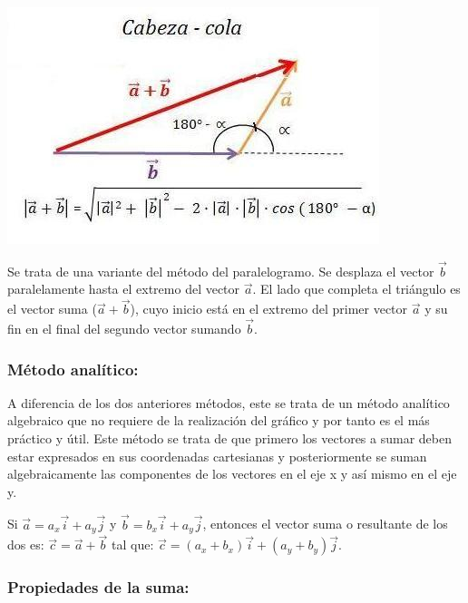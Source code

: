 \begin{center}
 \includegraphics[scale=0.7]{images/suma-vectores-metodo-cabeza-cola.jpg}
\end{center}

Se trata de una variante del método del paralelogramo. Se desplaza el vector $\vec{b}$ paralelamente hasta el extremo 
del vector $\vec{a}$. El lado que completa el triángulo es el vector suma ($\vec{a} + \vec{b}$), cuyo inicio está en el 
extremo del primer vector $\vec{a}$ y su fin en el final del segundo vector sumando $\vec{b}$. 
    
\subsubsection{Método analítico:}     

A diferencia de los dos anteriores métodos, este se trata de un método analítico algebraico que no requiere de la 
realización del gráfico y por tanto es el más práctico y útil. Este método se trata de que primero los vectores a sumar 
deben estar expresados en sus coordenadas cartesianas y posteriormente se suman algebraicamente las componentes de los 
vectores en el eje x y así mismo en el eje y.

\begin{tcolorbox}
 Si $\vec{a} = a_x\vec{i}+a_y\vec{j}$ y $\vec{b} = b_x\vec{i}+a_y\vec{j}$, entonces el vector suma o resultante de los 
dos es: $\vec{c} =\vec{a}+\vec{b}$ tal que: $\vec{c} = (a_x + b_x)\vec{i} +(a_y+b_y)\vec{j}$. 
\end{tcolorbox}

\subsubsection{Propiedades de la suma:}

